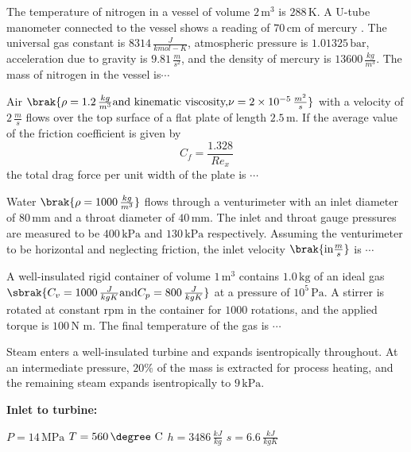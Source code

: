  \item The temperature of nitrogen in a vessel of volume $2 \, \text{m}^3$ is $288 \, \text{K}$. A U-tube manometer connected to the vessel shows a reading of $70 \, \text{cm}$ of mercury . The universal gas constant is $8314 \, \frac{J}{kmol-K}$, atmospheric pressure is $1.01325 \, \text{bar}$, acceleration due to gravity is $9.81 \, \frac{m}{s^2}$, and the density of mercury is $13600 \, \frac{kg}{m^3}$. The mass of nitrogen  in the vessel is$\cdots$

 \item Air $\brak{\rho = 1.2 \, \frac{kg}{m^3} \text{and kinematic viscosity,} \nu = 2 \times 10^{-5} \, \frac{m^2}{s}}$ with a velocity of $2 \, \frac{m}{s}$ flows over the top surface of a flat plate of length $2.5 \, \text{m}$. If the average value of the friction coefficient is given by
    \[
    C_f = \frac{1.328}{R{e_x}}
    \]
    the total drag force  per unit width of the plate is $\cdots$

  \item Water $\brak{\rho = 1000 \, \frac{kg}{m^3}}$ flows through a venturimeter with an inlet diameter of $80 \, \text{mm}$ and a throat diameter of $40 \, \text{mm}$. The inlet and throat gauge pressures are measured to be $400 \, \text{kPa}$ and $130 \, \text{kPa}$ respectively. Assuming the venturimeter to be horizontal and neglecting friction, the inlet velocity $\brak{\text{in} \frac{m}{s}}$ is $\cdots$

 \item A well-insulated rigid container of volume $1 \, \text{m}^3$ contains $1.0 \, \text{kg}$ of an ideal gas $\sbrak{C_v = 1000 \, \frac{J}{kgK} \text{and} C_p = 800 \, \frac{J}{kgK}}$ at a pressure of $10^5 \, \text{Pa}$. A stirrer is rotated at constant rpm in the container for $1000$ rotations, and the applied torque is $100 \, \text{N m}$. The final temperature of the gas  is $\cdots$

\item Steam enters a well-insulated turbine and expands isentropically throughout. At an intermediate pressure, $20\%$ of the mass is extracted for process heating, and the remaining steam expands isentropically to $9 \, \text{kPa}$.
    
    \textbf{Inlet to turbine:} 

         $P = 14 \, \text{MPa}$
         $T = 560 \, \text{\degree C}$
         $h = 3486 \, \frac{kJ}{kg}$
         $s = 6.6 \, \frac{kJ}{kgK}$

